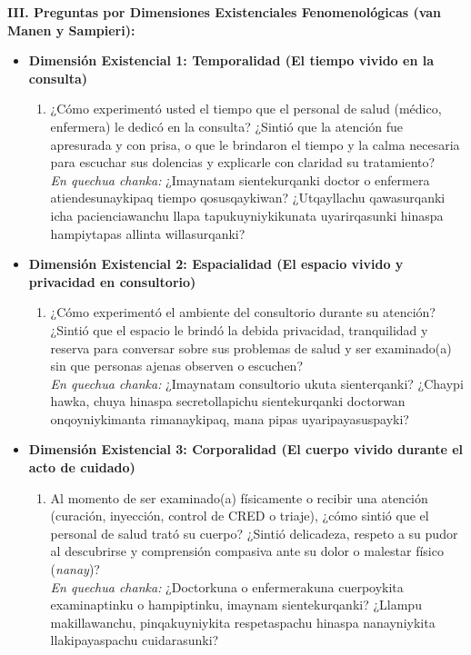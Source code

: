 \vspace{0.3cm}
\noindent\textbf{III. Preguntas por Dimensiones Existenciales Fenomenológicas (van Manen y Sampieri):}
\begin{itemize}
    \item \textbf{Dimensión Existencial 1: Temporalidad (El tiempo vivido en la consulta)}
    \begin{enumerate}[resume]
        \item ¿Cómo experimentó usted el tiempo que el personal de salud (médico, enfermera) le dedicó en la consulta? ¿Sintió que la atención fue apresurada y con prisa, o que le brindaron el tiempo y la calma necesaria para escuchar sus dolencias y explicarle con claridad su tratamiento?\\
        \textit{En quechua chanka:} ¿Imaynatam sientekurqanki doctor o enfermera atiendesunaykipaq tiempo qosusqaykiwan? ¿Utqayllachu qawasurqanki icha pacienciawanchu llapa tapukuyniykikunata uyarirqasunki hinaspa hampiytapas allinta willasurqanki?
    \end{enumerate}

    \item \textbf{Dimensión Existencial 2: Espacialidad (El espacio vivido y privacidad en consultorio)}
    \begin{enumerate}[resume]
        \item ¿Cómo experimentó el ambiente del consultorio durante su atención? ¿Sintió que el espacio le brindó la debida privacidad, tranquilidad y reserva para conversar sobre sus problemas de salud y ser examinado(a) sin que personas ajenas observen o escuchen?\\
        \textit{En quechua chanka:} ¿Imaynatam consultorio ukuta sienterqanki? ¿Chaypi hawka, chuya hinaspa secretollapichu sientekurqanki doctorwan onqoyniykimanta rimanaykipaq, mana pipas uyaripayasuspayki?
    \end{enumerate}

    \item \textbf{Dimensión Existencial 3: Corporalidad (El cuerpo vivido durante el acto de cuidado)}
    \begin{enumerate}[resume]
        \item Al momento de ser examinado(a) físicamente o recibir una atención (curación, inyección, control de CRED o triaje), ¿cómo sintió que el personal de salud trató su cuerpo? ¿Sintió delicadeza, respeto a su pudor al descubrirse y comprensión compasiva ante su dolor o malestar físico (\textit{nanay})?\\
        \textit{En quechua chanka:} ¿Doctorkuna o enfermerakuna cuerpoykita examinaptinku o hampiptinku, imaynam sientekurqanki? ¿Llampu makillawanchu, pinqakuyniykita respetaspachu hinaspa nanayniykita llakipayaspachu cuidarasunki?
    \end{enumerate}


\end{itemize}
